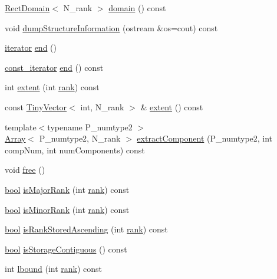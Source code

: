 \begin{DoxyCompactItemize}
\hyperlink{classRectDomain}{Rect\+Domain}$<$ N\+\_\+rank $>$ \hyperlink{classArray_acdc2828fb8f40c142359e43910d5873a}{domain} () const 
\item 
void \hyperlink{classArray_a36728606d550899621cd180cd5ef08df}{dump\+Structure\+Information} (ostream \&os=cout) const 
\item 
\hyperlink{classArray_a3c33a296e6b0d7290b3f2221660f70f1}{iterator} \hyperlink{classArray_ab7821a48f66e2e75ebdff82395bd7095}{end} ()
\item 
\hyperlink{classArray_ad00ebe258c5672331aad96dc6d7299ab}{const\+\_\+iterator} \hyperlink{classArray_aa609b8698ccad3e8940533dec11d201a}{end} () const 
\item 
int \hyperlink{classArray_a0e366d6568c6f976ea3657fea13794b7}{extent} (int \hyperlink{classArray_a1563c492c1be9d9b95a3f53d9cd89fae}{rank}) const 
\item 
const \hyperlink{classTinyVector}{Tiny\+Vector}$<$ int, N\+\_\+rank $>$ \& \hyperlink{classArray_a3c4295ecd7768bac320585eb3eb06c0d}{extent} () const 
\item 
{\footnotesize template$<$typename P\+\_\+numtype2 $>$ }\\\hyperlink{classArray}{Array}$<$ P\+\_\+numtype2, N\+\_\+rank $>$ \hyperlink{classArray_a4d293ccc3ae14833489a20cd6b760b89}{extract\+Component} (P\+\_\+numtype2, int comp\+Num, int num\+Components) const 
\item 
void \hyperlink{classArray_adee40224d813e0b6a4cb630a79cd9245}{free} ()
\item 
\hyperlink{compiler_8h_abb452686968e48b67397da5f97445f5b}{bool} \hyperlink{classArray_a0747ff0953c663e28e1f854bafb74c4b}{is\+Major\+Rank} (int \hyperlink{classArray_a1563c492c1be9d9b95a3f53d9cd89fae}{rank}) const 
\item 
\hyperlink{compiler_8h_abb452686968e48b67397da5f97445f5b}{bool} \hyperlink{classArray_ac4d39efdbef1a1bdfef9ddb9e935b890}{is\+Minor\+Rank} (int \hyperlink{classArray_a1563c492c1be9d9b95a3f53d9cd89fae}{rank}) const 
\item 
\hyperlink{compiler_8h_abb452686968e48b67397da5f97445f5b}{bool} \hyperlink{classArray_aa95744e1a65d959532be79597300cbcf}{is\+Rank\+Stored\+Ascending} (int \hyperlink{classArray_a1563c492c1be9d9b95a3f53d9cd89fae}{rank}) const 
\item 
\hyperlink{compiler_8h_abb452686968e48b67397da5f97445f5b}{bool} \hyperlink{classArray_a8531b2babb2fd35de4b78a0cec697e3a}{is\+Storage\+Contiguous} () const 
\item 
int \hyperlink{classArray_abd6504340a3749bd72c81e9eafb66df6}{lbound} (int \hyperlink{classArray_a1563c492c1be9d9b95a3f53d9cd89fae}{rank}) const 

\end{DoxyCompactItemize}
